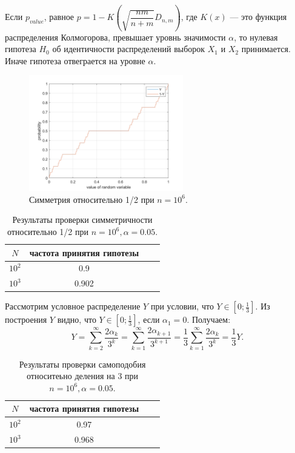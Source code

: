\documentclass[oneside, final, 12pt]{article}
\begin{document}
	Если $p_{value}$, равное $p = 1 - K\left(\sqrt{\dfrac{nm}{n+m}}D_{n,m}\right)$,
	где $K(x)$ --- это функция распределения Колмогорова, превышает уровнь
	значимости $\alpha$, то нулевая гипотеза $H_{0}$ 
	об идентичности распределений выборок $X_1$ и $X_2$ принимается. 
	Иначе гипотеза отвеграется на уровне $\alpha$.
		
	\begin{figure}[h!]
		\centering
		\includegraphics[width=0.6\textwidth]{../code/Task_2/pict/sim_1_vis_ex.png}
		\caption{Симметрия относительно 1/2 при $n=10^6$. }
    \end{figure}

	\begin{table}[h!]
	\begin{center}
		\begin{tabular}{|c|c|c|c|}
			\hline $N$ & частота принятия гипотезы \\ \hline
				$10^2$ & 0.9  \\ \hline
				$10^3$ & 0.902 \\ \hline
		\end{tabular}
		\caption{Результаты проверки симметричности относительно 1/2 при $n=10^6, \alpha = 0.05$.}
	\end{center}
	\end{table}
	\newpage
	Рассмотрим условное распределение $Y$ при условии, что $Y \in \left[0;\frac{1}{3}\right]$. Из построения 
	$Y$ видно, что $Y \in \left[0;\frac{1}{3}\right]$, если $\alpha_1 = 0$. Получаем:
	$$
		Y 	= \sum\limits_{k=2}^{\infty}\dfrac{2\alpha_k}{3^k} 
			= \sum\limits_{k=1}^{\infty}\dfrac{2\alpha_{k+1}}{3^{k+1}} 
			= \frac{1}{3}\sum\limits_{k=1}^{\infty}\dfrac{2\alpha_k}{3^k} 
			= \frac{1}{3}Y.
	$$
	
	\begin{table}[h!]
	\begin{center}
		\begin{tabular}{|c|c|c|c|}
			\hline $N$ & частота принятия гипотезы \\ \hline
				$10^2$ & 0.97  \\ \hline
				$10^3$ & 0.968 \\ \hline
		\end{tabular}
		\caption{Результаты проверки самоподобия относитеьно деления на 3 при $n=10^6, \alpha = 0.05$.}
	\end{center}
	\end{table}
	
\end{document}
